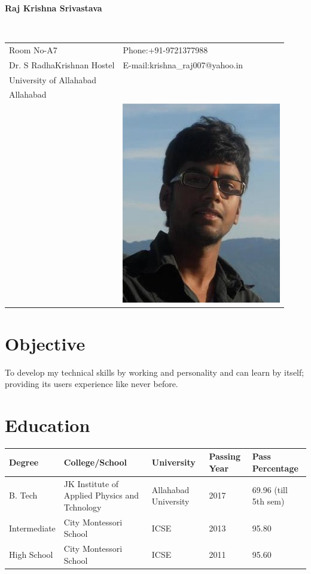 \documentclass[12pt]{article}
\begin{document}
\vspace{0.5in}
\begin{center}\begin{large}\textbf{Raj Krishna Srivastava}\end{large}\end{center}\textbf{\hrulefill}\\

\begin{tabular}{@{}p{4in}p{3in}}
Room No-A7 & {Phone:}+91-9721377988 \\
Dr. S RadhaKrishnan Hostel & {E-mail:}krishna\_raj007@yahoo.in\\
University of Allahabad \\
Allahabad\\
& \includegraphics[scale=0.4]{rajKrishna.jpg}\\
\end{tabular}
\section*{Objective}
To develop my technical skills by working  and personality and can learn by itself; providing its users experience like never before.   
\section*{Education}
\begin{tabular}{|l|l|l|l|l|}
\hline
Degree & College/School & University & Passing Year & Pass Percentage\\
\hline
B. Tech & JK Institute of Applied Physics and Tchnology & Allahabad University & 2017 & 69.96 (till 5th sem)\\
\hline
Intermediate & City Montessori School & ICSE & 2013 & 95.80\\
\hline
High School & City Montessori School & ICSE & 2011 & 95.60\\
\hline
\end{tabular}
\end{document}
